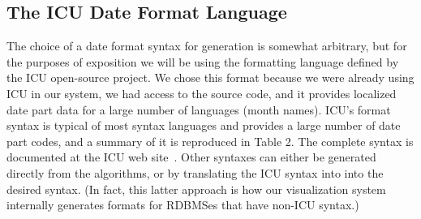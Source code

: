 \subsection{The ICU Date Format Language}

The choice of a date format syntax for generation is somewhat arbitrary, but for the purposes of exposition we will be using the formatting language defined by the ICU open-source project. We chose this format because we were already using ICU in our system, we had access to the source code, and it provides localized date part data for a large number of languages (\eg month names). ICU's format syntax is typical of most syntax languages and provides a large number of date part codes, and a summary of it is reproduced in Table 2. The complete syntax is documented at the ICU web site~\cite{ICU}.  Other syntaxes can either be generated directly from the algorithms, or by translating the ICU syntax into into the desired syntax. (In fact, this latter approach is how our visualization system internally generates formats for RDBMSes that have non-ICU syntax.)


